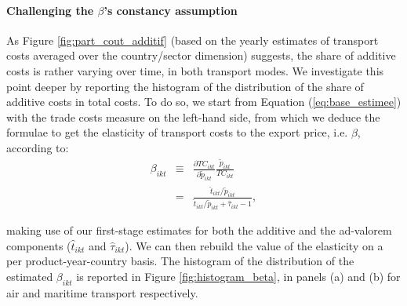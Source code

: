 \documentclass[a4paper,11pt]{article}
\begin{document}
\paragraph{Challenging the $\beta$'s constancy assumption} As Figure \ref{fig:part_cout_additif} (based on the yearly estimates of transport costs averaged over the country/sector dimension) suggests, the share of additive costs is rather varying over time, in both transport modes.
We investigate this point deeper by reporting the histogram of the distribution of the share of additive costs in total costs.
To do so, we start from Equation (\ref{eq:base_estimee}) with the trade costs measure on the left-hand side, from which we deduce the formulae to get the elasticity of transport costs to the export price, i.e.
$\beta$, according to:
\begin{eqnarray*}
\beta_{ikt} &\equiv& \frac{\partial TC_{ikt}}{\partial \widetilde{p}_{ikt}}\frac{\widetilde{p}_{ikt}}{TC_{ikt}} \\
&=& \frac{\widehat{t}_{ikt}/\widetilde{p}_{ikt}}{\widehat{t}_{ikt}/\widetilde{p}_{ikt}+\widehat{\tau}_{ikt}-1},
\end{eqnarray*}

\noindent making use of our first-stage estimates for both the additive and the ad-valorem components ($\widehat{t}_{ikt}$ and $\widehat{\tau}_{ikt}$).
We can then rebuild the value of the elasticity on a per product-year-country basis.
The histogram of the distribution of the estimated $\beta_{ikt}$ is reported in Figure \ref{fig:histogram_beta}, in panels (a) and (b) for air and maritime transport respectively.
\end{document}
